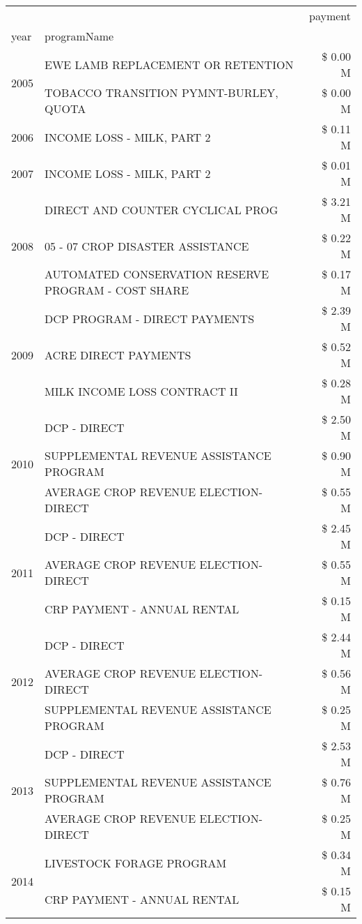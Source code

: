 \begin{tabular}{llr}
\toprule
 &  & payment \\
year & programName &  \\
\midrule
\multirow[t]{2}{*}{2005} & EWE LAMB REPLACEMENT OR RETENTION & \$ 0.00 M \\
 & TOBACCO TRANSITION PYMNT-BURLEY, QUOTA & \$ 0.00 M \\
\cline{1-3}
2006 & INCOME LOSS - MILK, PART 2 & \$ 0.11 M \\
\cline{1-3}
2007 & INCOME LOSS - MILK, PART 2 & \$ 0.01 M \\
\cline{1-3}
\multirow[t]{3}{*}{2008} & DIRECT AND COUNTER CYCLICAL PROG & \$ 3.21 M \\
 & 05 - 07 CROP DISASTER ASSISTANCE & \$ 0.22 M \\
 & AUTOMATED CONSERVATION RESERVE PROGRAM - COST SHARE & \$ 0.17 M \\
\cline{1-3}
\multirow[t]{3}{*}{2009} & DCP PROGRAM - DIRECT PAYMENTS & \$ 2.39 M \\
 & ACRE DIRECT PAYMENTS & \$ 0.52 M \\
 & MILK INCOME LOSS CONTRACT II & \$ 0.28 M \\
\cline{1-3}
\multirow[t]{3}{*}{2010} & DCP - DIRECT & \$ 2.50 M \\
 & SUPPLEMENTAL REVENUE ASSISTANCE PROGRAM & \$ 0.90 M \\
 & AVERAGE CROP REVENUE ELECTION-DIRECT & \$ 0.55 M \\
\cline{1-3}
\multirow[t]{3}{*}{2011} & DCP - DIRECT & \$ 2.45 M \\
 & AVERAGE CROP REVENUE ELECTION-DIRECT & \$ 0.55 M \\
 & CRP PAYMENT - ANNUAL RENTAL & \$ 0.15 M \\
\cline{1-3}
\multirow[t]{3}{*}{2012} & DCP - DIRECT & \$ 2.44 M \\
 & AVERAGE CROP REVENUE ELECTION-DIRECT & \$ 0.56 M \\
 & SUPPLEMENTAL REVENUE ASSISTANCE PROGRAM & \$ 0.25 M \\
\cline{1-3}
\multirow[t]{3}{*}{2013} & DCP - DIRECT & \$ 2.53 M \\
 & SUPPLEMENTAL REVENUE ASSISTANCE PROGRAM & \$ 0.76 M \\
 & AVERAGE CROP REVENUE ELECTION-DIRECT & \$ 0.25 M \\
\cline{1-3}
\multirow[t]{3}{*}{2014} & LIVESTOCK FORAGE PROGRAM & \$ 0.34 M \\
 & CRP PAYMENT - ANNUAL RENTAL & \$ 0.15 M \\

\end{tabular}
